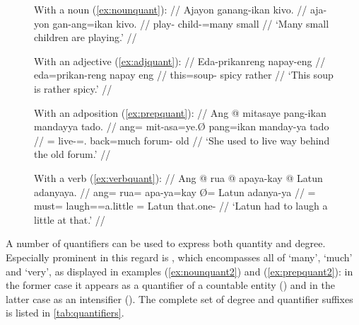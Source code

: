 \begin{figure}[h]
\pex\label{ex:posquant}
\a\label{ex:nounquant2}\begingl
	\glpreamble With a noun (\ref{ex:nounquant}): //
	\gla Ajayon ganang-ikan kivo. //
	\glb aja-yon gan-ang=ikan kivo. //
	\glc play-\TsgN{} child-\Aarg{}=many small //
	\glft `Many small children are playing.' //
\endgl

\a\label{ex:adjquant2}\begingl
	\glpreamble With an adjective (\ref{ex:adjquant}): //
	\gla Eda-prikanreng napay-eng //
	\glb eda=prikan-reng {napay eng} //
	\glc this=soup-\AargI{} {spicy rather} //
	\glft `This soup is rather spicy.' //
\endgl

\a\label{ex:prepquant2}\begingl
	\glpreamble With an adposition (\ref{ex:prepquant}): //
	\gla Ang @ mitasaye pang-ikan mandayya tado. //
	\glb ang= mit-asa=ye.Ø pang=ikan manday-ya tado //
	\glc \AgtT{}= live-\Hab{}=\TsgF{}.\Top{} back=much forum-\Loc{} old //
	\glft `She used to live way behind the old forum.' //
\endgl

\a\label{ex:verbquant2}\begingl
	\glpreamble With a verb (\ref{ex:verbquant}): //
	\gla Ang @ rua @ apaya-kay {} @ Latun adanyaya. //
	\glb ang= rua= apa-ya=kay Ø= Latun adanya-ya //
	\glc \AgtT{}= must= laugh=\TsgM{}=a.little \Top{}= Latun that.one-\Loc{} //
	\glft `Latun had to laugh a little at that.' //
\endgl
\xe
\end{figure}

A number of quantifiers can be used to express both quantity and degree.
Especially prominent in this regard is , which encompasses
all of `many', `much' and `very', as displayed in examples (\ref{ex:nounquant2})
and (\ref{ex:prepquant2}): in the former case it appears as a quantifier of a
countable entity () and in the
latter case as an intensifier (). The
complete set of degree and quantifier suffixes is listed in
\autoref{tab:quantifiers}.

